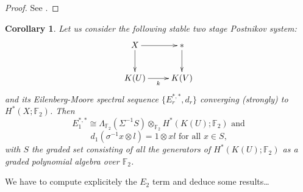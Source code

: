 \documentclass[11pt,a4paper]{amsart}
\theoremstyle{plain}
\newtheorem{cor}[thm]{Corollary}
\theoremstyle{definition}
\theoremstyle{remark}
\newcommand{\F}{\mathbb{F}}
\begin{document}
\begin{proof}
See \cite[Corollary 7.23, p. 260]{Mc-00}.
\end{proof}

\begin{cor}\label{c:system}
Let us consider the following stable two stage Postnikov system:
$$\xymatrix{
X\ar[r]\ar[d] &{*}\ar[d]\\
K(U)\ar[r]_-k &K(V)
}$$ and its Eilenberg-Moore spectral sequence $\{E_r^{*,*},d_r\}$ converging (strongly) to $H^*(X;\F_2)$. Then
$$
E_1^{*,*}\cong\Lambda_{\F_2}(\Sigma^{-1}S)\otimes_{\F_2}H^*(K(U);\F_2)\text{ and}
$$ 
$$
d_1(\sigma^{-1}x\otimes l)=1\otimes xl\text{ for all $x\in S$,}
$$ with $S$ the graded set consisting of all the generators of $H^*(K(U);\F_2)$ as a graded polynomial algebra over $\F_2$.
\end{cor}

We have to compute explicitely the $E_2$ term and deduce some results\dots

\end{document}
